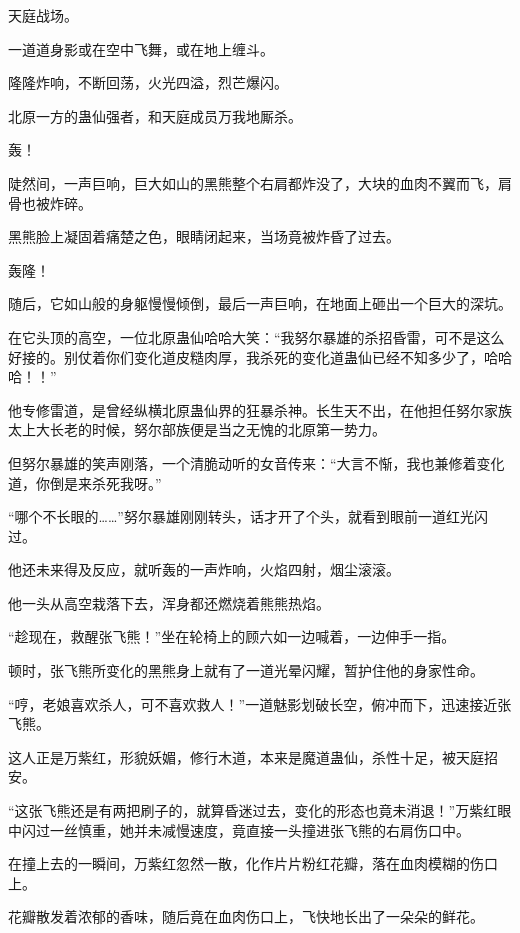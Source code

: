 
\begin{this_body}

天庭战场。

一道道身影或在空中飞舞，或在地上缠斗。

隆隆炸响，不断回荡，火光四溢，烈芒爆闪。

北原一方的蛊仙强者，和天庭成员万我地厮杀。

轰！

陡然间，一声巨响，巨大如山的黑熊整个右肩都炸没了，大块的血肉不翼而飞，肩骨也被炸碎。

黑熊脸上凝固着痛楚之色，眼睛闭起来，当场竟被炸昏了过去。

轰隆！

随后，它如山般的身躯慢慢倾倒，最后一声巨响，在地面上砸出一个巨大的深坑。

在它头顶的高空，一位北原蛊仙哈哈大笑：“我努尔暴雄的杀招昏雷，可不是这么好接的。别仗着你们变化道皮糙肉厚，我杀死的变化道蛊仙已经不知多少了，哈哈哈！！”

他专修雷道，是曾经纵横北原蛊仙界的狂暴杀神。长生天不出，在他担任努尔家族太上大长老的时候，努尔部族便是当之无愧的北原第一势力。

但努尔暴雄的笑声刚落，一个清脆动听的女音传来：“大言不惭，我也兼修着变化道，你倒是来杀死我呀。”

“哪个不长眼的……”努尔暴雄刚刚转头，话才开了个头，就看到眼前一道红光闪过。

他还未来得及反应，就听轰的一声炸响，火焰四射，烟尘滚滚。

他一头从高空栽落下去，浑身都还燃烧着熊熊热焰。

“趁现在，救醒张飞熊！”坐在轮椅上的顾六如一边喊着，一边伸手一指。

顿时，张飞熊所变化的黑熊身上就有了一道光晕闪耀，暂护住他的身家性命。

“哼，老娘喜欢杀人，可不喜欢救人！”一道魅影划破长空，俯冲而下，迅速接近张飞熊。

这人正是万紫红，形貌妖媚，修行木道，本来是魔道蛊仙，杀性十足，被天庭招安。

“这张飞熊还是有两把刷子的，就算昏迷过去，变化的形态也竟未消退！”万紫红眼中闪过一丝慎重，她并未减慢速度，竟直接一头撞进张飞熊的右肩伤口中。

在撞上去的一瞬间，万紫红忽然一散，化作片片粉红花瓣，落在血肉模糊的伤口上。

花瓣散发着浓郁的香味，随后竟在血肉伤口上，飞快地长出了一朵朵的鲜花。


\end{this_body}

